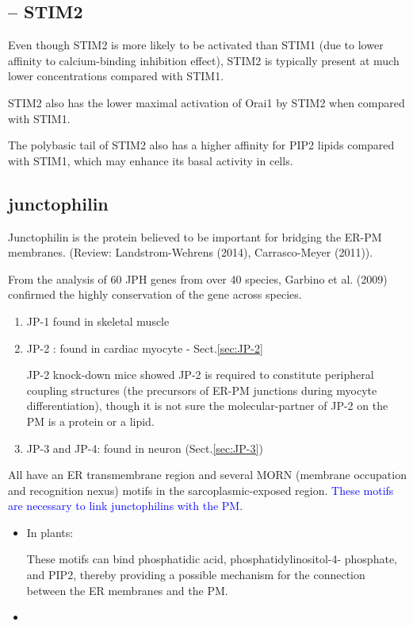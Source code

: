 \subsection{ -- STIM2}
\label{sec:STIM2}

Even though STIM2 is more likely to be activated than STIM1 (due to lower
affinity to calcium-binding inhibition effect), STIM2 is typically present at
much lower concentrations compared with STIM1.

STIM2 also has the lower maximal activation of Orai1 by STIM2 when compared with
STIM1.

The polybasic tail of STIM2 also has a higher affinity for PIP2 lipids compared
with STIM1, which may enhance its basal activity in cells. 





\subsection{junctophilin}
\label{sec:junctophilin}


Junctophilin is the protein believed to be important for bridging the ER-PM
membranes. (Review: Landstrom-Wehrens (2014), Carrasco-Meyer (2011)).

From the analysis of 60 JPH genes from over 40 species, Garbino et al. (2009)
confirmed the highly conservation of the gene across species.


\begin{enumerate}
  \item JP-1 found in skeletal muscle
  
  \item JP-2 : found in cardiac myocyte - Sect.\ref{sec:JP-2}

JP-2 knock-down mice showed JP-2 is required to constitute peripheral
coupling structures (the precursors of ER-PM junctions during myocyte
differentiation), though it is not sure the molecular-partner of JP-2 on the PM
is a protein or a lipid.
  
  \item JP-3 and JP-4: found in neuron
  (Sect.\ref{sec:JP-3})
\end{enumerate}

All have an ER transmembrane region and several MORN (membrane occupation and
recognition nexus) motifs in the sarcoplasmic-exposed region.
\textcolor{blue}{These motifs are necessary to link junctophilins with the PM}.
\begin{itemize}
  \item In plants:
  
These motifs can bind phosphatidic acid, phosphatidylinositol-4- phosphate, and
PIP2, thereby providing a possible mechanism for the connection between the ER
membranes and the PM.
 
  \item 
\end{itemize}

